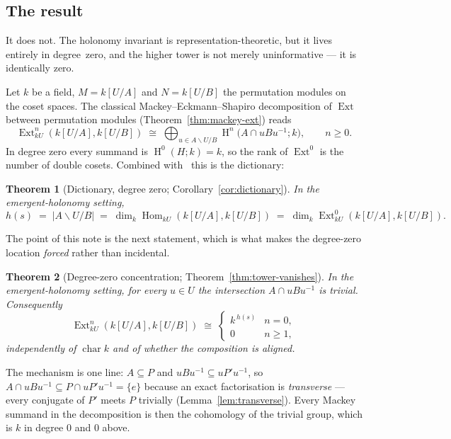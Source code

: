 \documentclass[11pt]{amsart}
\theoremstyle{plain}
\newtheorem{theorem}{Theorem}
\theoremstyle{definition}
\DeclareMathOperator{\Hom}{Hom}
\DeclareMathOperator{\Ext}{Ext}
\DeclareMathOperator{\Hh}{H}
\newcommand{\dcoset}[3]{#1\backslash #2/#3}
\begin{document}
\subsection*{The result}
It does not. The holonomy invariant is representation-theoretic, but it lives entirely in
degree~zero, and the higher tower is not merely uninformative --- it is identically zero.

Let $k$ be a field, $M=k[U/A]$ and $N=k[U/B]$ the permutation modules on the coset spaces.
The classical Mackey--Eckmann--Shapiro decomposition of $\Ext$ between permutation modules
(Theorem~\ref{thm:mackey-ext}) reads
\[
   \Ext^n_{kU}(k[U/A],k[U/B])\;\cong\;
   \bigoplus_{u\in \dcoset{A}{U}{B}} \Hh^n\!\bigl(A\cap uBu^{-1};k\bigr),
   \qquad n\ge 0.
\]
In degree zero every summand is $\Hh^0(H;k)=k$, so the rank of $\Ext^0$ is the number of
double cosets. Combined with~\cite{macbeth-meeting} this is the dictionary:

\begin{theorem}[Dictionary, degree zero; Corollary~\ref{cor:dictionary}]\label{thm:intro-dict}
In the emergent-holonomy setting,
\[
  h(s)\;=\;\lvert\dcoset{A}{U}{B}\rvert
        \;=\;\dim_k\Hom_{kU}(k[U/A],k[U/B])
        \;=\;\dim_k\Ext^0_{kU}(k[U/A],k[U/B]).
\]
\end{theorem}

The point of this note is the next statement, which is what makes the degree-zero
location \emph{forced} rather than incidental.

\begin{theorem}[Degree-zero concentration; Theorem~\ref{thm:tower-vanishes}]\label{thm:intro-tower}
In the emergent-holonomy setting, for \emph{every} $u\in U$ the intersection
$A\cap uBu^{-1}$ is trivial. Consequently
\[
   \Ext^n_{kU}(k[U/A],k[U/B])\;\cong\;
   \begin{cases} k^{\,h(s)} & n=0,\\[2pt] 0 & n\ge 1,\end{cases}
\]
independently of $\operatorname{char}k$ and of whether the composition is aligned.
\end{theorem}

The mechanism is one line: $A\subseteq P$ and $uBu^{-1}\subseteq uP'u^{-1}$, so
$A\cap uBu^{-1}\subseteq P\cap uP'u^{-1}=\{e\}$ because an exact factorisation is
\emph{transverse} --- every conjugate of $P'$ meets $P$ trivially (Lemma~\ref{lem:transverse}).
Every Mackey summand in the decomposition is then the cohomology of the trivial group,
which is $k$ in degree $0$ and $0$ above.
\end{document}
